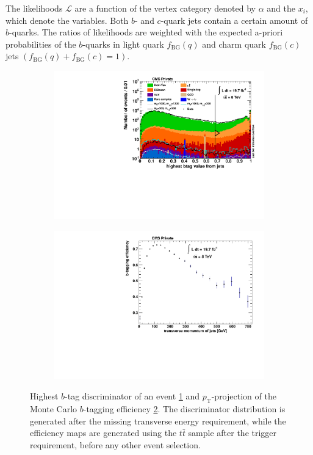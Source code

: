 \noindent The likelihoods $\mathcal{L}$ are a function of the vertex category denoted by $\alpha$ and the $x_i$, which denote the variables. Both $b$- and $c$-quark jets contain a certain amount of $b$-quarks. The ratios of likelihoods are weighted with the expected a-priori probabilities of the $b$-quarks in light quark $f_{\text{BG}}(q)$ and charm quark $f_{\text{BG}}(c)$ jets $(f_{\text{BG}}(q) + f_{\text{BG}}(c) = 1)$.

\begin{figure}[htb!]
  \centering
  \begin{subfigure}[b]{0.495\textwidth}
    \centering
    \includegraphics[width=\textwidth]{plots/1st_btag.pdf}
    \caption{\label{fig:1st_btag}}
  \end{subfigure}
  \begin{subfigure}[b]{0.495\textwidth}
    \centering
    \includegraphics[width=\textwidth]{plots/b_proj.pdf}
    \caption{\label{fig:b_proj}}
  \end{subfigure}
  \caption{Highest $b$-tag discriminator of an event \ref{fig:1st_btag} and $p_{\text{T}}$-projection of the Monte Carlo $b$-tagging efficiency \ref{fig:b_proj}. The discriminator distribution is generated after the missing transverse energy requirement, while the efficiency maps are generated using the $t\bar{t}$ sample after the trigger requirement, before any other event selection.}
  \label{fig:btag}
\end{figure}

